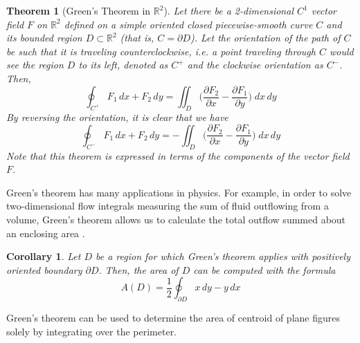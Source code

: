 \documentclass{article}
\newtheorem{theorem}{Theorem}[section]
\newtheorem{corollary}{Corollary}[theorem]
\theoremstyle{remark}
\theoremstyle{definition}
\begin{document}
\begin{theorem}[Green's Theorem in $\mathbb{R}^2$]
Let there be a 2-dimensional $C^1$ vector field $F$ on $\mathbb{R}^2$ defined on a simple oriented closed piecewise-smooth curve $C$ and its bounded region $D \subset \mathbb{R}^2$ (that is, $C = \partial D$). Let the orientation of the path of $C$ be such that it is traveling \textit{counterclockwise}, i.e. a point traveling through $C$ would see the region $D$ to its \textit{left}, denoted as $C^+$ and the clockwise orientation as $C^-$.  Then, 
\[\oint_{C^+} F_1 \, d x + F_2 \, d y = \iint_D \bigg( \frac{\partial F_2}{\partial x} - \frac{\partial F_1}{\partial y} \bigg) \; d x \, d y\]
By reversing the orientation, it is clear that we have
\[\oint_{C^-} F_1 \, d x + F_2 \, d y = - \iint_D \bigg( \frac{\partial F_2}{\partial x} - \frac{\partial F_1}{\partial y} \bigg) \; d x \, d y\]
Note that this theorem is expressed in terms of the components of the vector field $F$. 
\begin{center}
\end{center}
\end{theorem}

Green's theorem has many applications in physics. For example, in order to solve two-dimensional flow integrals measuring the sum of fluid outflowing from a volume, Green's theorem allows us to calculate the total outflow summed about an enclosing area . 

\begin{corollary}
Let $D$ be a region for which Green's theorem applies with positively oriented boundary $\partial D$. Then, the area of $D$ can be computed with the formula
\[A(D) = \frac{1}{2} \oint_{\partial D} x \, d y - y \, d x\]
\end{corollary}

Green's theorem can be used to determine the area of centroid of plane figures solely by integrating over the perimeter. 
\end{document}
